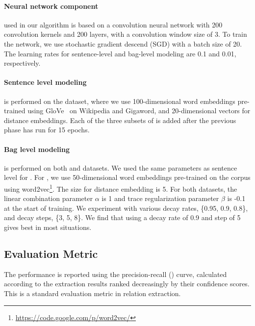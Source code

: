 \paragraph{Neural network component} used in our algorithm is based on a convolution neural network with 200 convolution kernels and 200 layers, with a convolution window size of 3. To train the network, we use stochastic gradient descend (SGD) with a batch size of 20.  The learning rates for sentence-level  and bag-level modeling are 0.1 and 0.01, respectively.


\paragraph{Sentence level modeling}
 is performed on the \TimeRE dataset, where we use 100-dimensional word embeddings pre-trained using GloVe~\cite{pennington2014glove} on Wikipedia and Gigaword, and 20-dimensional vectors for distance embeddings. Each of the three subsets of \TimeRE is added after the previous phase has run for 15 epochs. 

\paragraph{Bag level modeling}
is performed on both  \TimeRE and  \EntityRE datasets. We used the same parameters as sentence level for \TimeRE. 
For \EntityRE, we use 50-dimensional word embeddings pre-trained on the \NYT corpus using word2vec\footnote{\url{ https://code.google.com/p/word2vec/}}. The size for distance embedding  is 5. For both datasets, the linear combination parameter $\alpha$ is 1 and trace regularization parameter $\beta$ is -0.1 at the start of training. We experiment with various decay rates, \{0.95, 0.9, 0.8\}, and decay steps, \{3, 5, 8\}. We find that using a decay rate of 0.9 and step of 5 gives best in most situations.

\subsection{Evaluation Metric}
The performance is reported using the precision-recall (\PR) curve, calculated according to the extraction results ranked decreasingly by their confidence scores. This is a standard evaluation metric in relation extraction.

